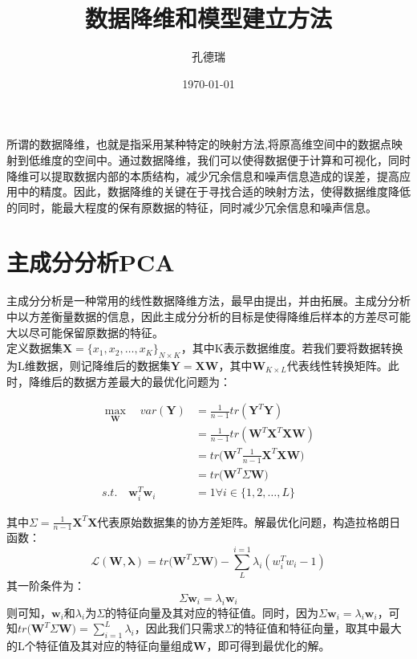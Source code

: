 \documentclass[a4paper]{article}
\title{数据降维和模型建立方法}
\author{孔德瑞}
\date{\today}
\begin{document}
\maketitle

所谓的数据降维，也就是指采用某种特定的映射方法,将原高维空间中的数据点映射到低维度的空间中。通过数据降维，我们可以使得数据便于计算和可视化，同时降维可以提取数据内部的本质结构，减少冗余信息和噪声信息造成的误差，提高应用中的精度。因此，数据降维的关键在于寻找合适的映射方法，使得数据维度降低的同时，能最大程度的保有原数据的特征，同时减少冗余信息和噪声信息。

\section{主成分分析PCA}

主成分分析是一种常用的线性数据降维方法，最早由\textcite{RN6157}提出，并由\textcite{RN6158}拓展。主成分分析中以方差衡量数据的信息，因此主成分分析的目标是使得降维后样本的方差尽可能大以尽可能保留原数据的特征。\\

定义数据集$\mathbf{X}=\{x_1,x_2,\ldots,x_K\}_{N\times K}$，其中K表示数据维度。若我们要将数据转换为L维数据，则记降维后的数据集$\mathbf{Y}=\mathbf{X}\mathbf{W}$，其中$\mathbf{W}_{K\times L}$代表线性转换矩阵。此时，降维后的数据方差最大的最优化问题为：

\begin{align}
\max_{\mathbf{W}}\quad var(\mathbf{Y})&=\frac{1}{n-1}tr(\mathbf{Y}^T \mathbf{Y})\\
&=\frac{1}{n-1}tr(\mathbf{W}^T \mathbf{X}^T \mathbf{X} \mathbf{W})\\
&=tr\bigg(\mathbf{W}^T \frac{1}{n-1} \mathbf{X}^T \mathbf{X} \mathbf{W}\bigg)\\
&=tr\bigg(\mathbf{W}^T \Sigma \mathbf{W}\bigg)\\
s.t. \quad \mathbf{w}_i^T \mathbf{w}_i &=1 \forall i \in \{ 1,2,\ldots,L \}
\end{align}

其中$\Sigma=\frac{1}{n-1} \mathbf{X}^T \mathbf{X}$代表原始数据集的协方差矩阵。解最优化问题，构造拉格朗日函数：
\begin{equation}
\mathcal{L}(\mathbf{W},\mathbf{\lambda})=tr\bigg(\mathbf{W}^T \Sigma\mathbf{W}\bigg)-\sum_{L}^{i=1}\lambda_i(w_i^T w_i-1)
\end{equation}
其一阶条件为：
\begin{equation}
\Sigma \mathbf{w}_i=\lambda_i\mathbf{w}_i
\end{equation}
则可知，$\mathbf{w}_i$和$\lambda_i$为$\Sigma$的特征向量及其对应的特征值。同时，因为$\Sigma\mathbf{w}_i=\lambda_i\mathbf{w}_i
$，可知$tr\bigg(\mathbf{W}^T \Sigma \mathbf{W}\bigg)=\sum_{i=1}^{L}\lambda_i$，因此我们只需求$\Sigma$的特征值和特征向量，取其中最大的L个特征值及其对应的特征向量组成$\mathbf{W}$，即可得到最优化的解。
\end{document}
